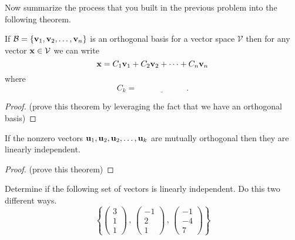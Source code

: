 Now summarize the process that you built in the previous problem into the following
theorem.
\begin{thm}\label{thm:orthogonal_basis}
    If $\mathcal{B} = \{{\bf v}_1, {\bf v}_2, \ldots, {\bf v}_n\}$ is an orthogonal basis for a vector
    space $\mathcal{V}$ then for any vector ${\bf x} \in \mathcal{V}$ we can write
    \[ {\bf x} = C_1 {\bf v}_1 + C_2 {\bf v}_2 + \cdots + C_n {\bf v}_n \]
    where
    \[ C_k = \underline{\hspace{1in}}. \]
\end{thm}
\begin{proof}
    (prove this theorem by leveraging the fact that we have an orthogonal basis)
\end{proof}


\begin{thm}
    If the nonzero vectors ${\bf u}_1, {\bf u}_2, {\bf u}_2, \dots, {\bf u}_k$ are mutually orthogonal
    then they are linearly independent.
\end{thm}
\begin{proof}
    (prove this theorem)
\end{proof}


\begin{problem}
    Determine if the following set of vectors is linearly independent.  Do this two
    different ways.
    \[ \left\{ \begin{pmatrix} 3 \\ 1 \\ 1 \end{pmatrix} \, , \, \begin{pmatrix} -1 \\ 2
            \\ 1
    \end{pmatrix} \, , \, \begin{pmatrix} -1 \\ -4 \\ 7 \end{pmatrix} \right\} \]
\end{problem}







